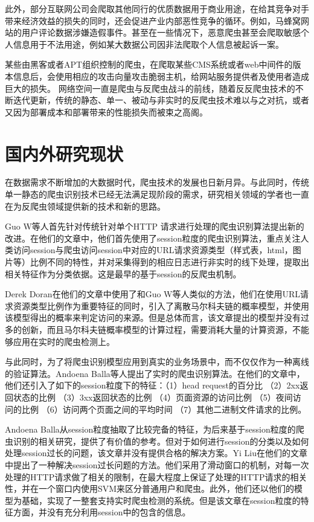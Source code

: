 \documentclass[doctor,privacy,twoside]{buaa_mac}
\begin{document}
此外，部分互联网公司会爬取其他同行的优质数据用于商业用途，在给其竞争对手带来经济效益的损失的同时，还会促进产业内部恶性竞争的循环。例如，马蜂窝网站的用户评论数据涉嫌造假事件。甚至在一些情况下，恶意爬虫甚至会爬取敏感个人信息用于不法用途，例如某大数据公司因非法爬取个人信息被起诉一案。

某些由黑客或者APT组织控制的爬虫，在爬取某些CMS系统或者web中间件的版本信息后，会使用相应的攻击向量攻击脆弱主机，给网站服务提供者及使用者造成巨大的损失。
网络空间一直是爬虫与反爬虫战斗的前线，随着反反爬虫技术的不断迭代更新，传统的静态、单一、被动与非实时的反爬虫技术难以与之对抗，或者又因为部署成本和部署带来的性能损失而被束之高阁。

\section{国内外研究现状}
  在数据需求不断增加的大数据时代，爬虫技术的发展也日新月异。与此同时，传统单一静态的爬虫识别技术已经无法满足现阶段的需求，研究相关领域的学者也一直在为反爬虫领域提供新的技术和新的思路。

  Guo W等人首先针对传统针对单个HTTP 请求进行处理的爬虫识别算法提出新的改进。在他们的文章中，他们首先使用了session粒度的爬虫识别算法，重点关注人类访问session与爬虫访问session中对应的URL请求资源类型（样式表，html，图片等）比例不同的特性，并对采集得到的相应日志进行非实时的线下处理，提取出相关特征作为分类依据。这是最早的基于session的反爬虫机制。
  
  Derek Doran在他们的文章中使用了和Guo W等人类似的方法，他们在使用URL请求资源类型比例作为重要特征的同时，引入了离散马尔科夫链的概率模型，并使用该模型得出的概率来判定访问的来源。但是总体而言，该文章提出的模型并没有过多的创新，而且马尔科夫链概率模型的计算过程，需要消耗大量的计算资源，不能够应用在实时的爬虫检测上。
 
   与此同时，为了将爬虫识别模型应用到真实的业务场景中，而不仅仅作为一种离线的验证算法。Andoena Balla等人提出了实时的爬虫识别算法。在他们的文章中，他们还引入了如下的session粒度下的特征：（1）head request的百分比 （2）2xx返回状态的比例 （3）3xx返回状态的比例 （4）页面资源的访问比例 （5）夜间访问的比例  （6）访问两个页面之间的平均时间  （7）其他二进制文件请求的比例。
   
   Andoena Balla从session粒度抽取了比较完备的特征，为后来基于session粒度的爬虫识别的相关研究，提供了有价值的参考。但对于如何进行session的分类以及如何处理session过长的问题，该文章并没有提供合格的解决方案。Yi Liu在他们的文章中提出了一种解决session过长问题的方法。他们采用了滑动窗口的机制，对每一次处理的HTTP请求做了相关的限制，在最大程度上保证了处理的HTTP请求的相关性，并在一个窗口内使用SVM来区分普通用户和爬虫。此外，他们还以他们的模型为基础，实现了一整套支持实时爬虫检测的系统。但是该文章在session粒度的特征方面，并没有充分利用session中的包含的信息。
 
\end{document}
